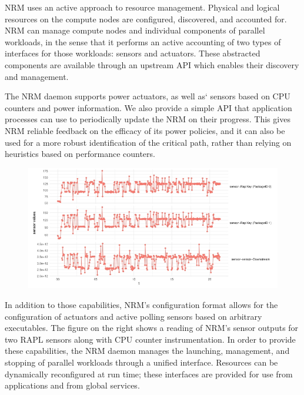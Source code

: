 NRM uses an active approach to resource management. Physical and logical
resources on the compute nodes are configured, discovered, and accounted for.
NRM can manage compute nodes and individual components of parallel workloads,
in the sense that it performs an active accounting of two types of interfaces
for those workloads: sensors and actuators. These abstracted components are
available through an upstream API which enables their discovery and management.

The NRM daemon supports power actuators, as well as` sensors based on CPU counters
and power information. We also provide a simple API that application processes
can use to periodically update the NRM on their progress. This gives NRM
reliable feedback on the efficacy of its power policies, and it can also
be used for a more robust identification of the critical path, rather than
relying on heuristics based on performance counters.

\begin{figure}
  \includegraphics[width=.58\textwidth]{projects/2.3.1-PMR/2.3.1.19-Argo-PowerSteering/sensors}
\end{figure}
In addition to those capabilities, NRM's configuration format allows for
the configuration of actuators and active polling sensors based on arbitrary
executables. The figure on the right shows a reading of NRM's sensor
outputs for two RAPL sensors along with CPU counter instrumentation. In order
to provide these capabilities, the NRM daemon manages the launching, management,
and stopping of parallel workloads through a unified interface. Resources
can be dynamically reconfigured at run time; these interfaces are provided
for use from applications and from global services.

